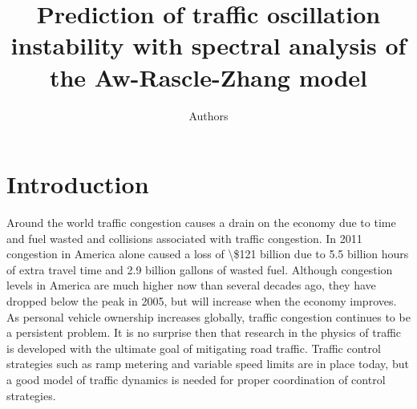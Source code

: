 \documentclass[preprint]{elsarticle}
\begin{document}
\begin{frontmatter}

\title{Prediction of traffic oscillation instability with spectral analysis of the Aw-Rascle-Zhang model}

\author[add]{Authors}
\address[add]{address}
%
%
%

\begin{abstract}

\end{abstract}

\begin{keyword}

\end{keyword}

\end{frontmatter}


\section{Introduction}

Around the world traffic congestion causes a drain on the economy
due to time and fuel wasted and collisions associated with traffic
congestion. In 2011 congestion in America alone caused a loss of \textbackslash{}\$121
billion due to 5.5 billion hours of extra travel time and 2.9 billion
gallons of wasted fuel. Although congestion levels in America are
much higher now than several decades ago, they have dropped below
the peak in 2005, but will increase when the economy improves\cite{Texas}.
As personal vehicle ownership increases globally, traffic congestion
continues to be a persistent problem. It is no surprise then that
research in the physics of traffic is developed with the ultimate
goal of mitigating road traffic. Traffic control strategies such as
ramp metering and variable speed limits are in place today, but a
good model of traffic dynamics is needed for proper coordination of
control strategies. \\
\end{document}
